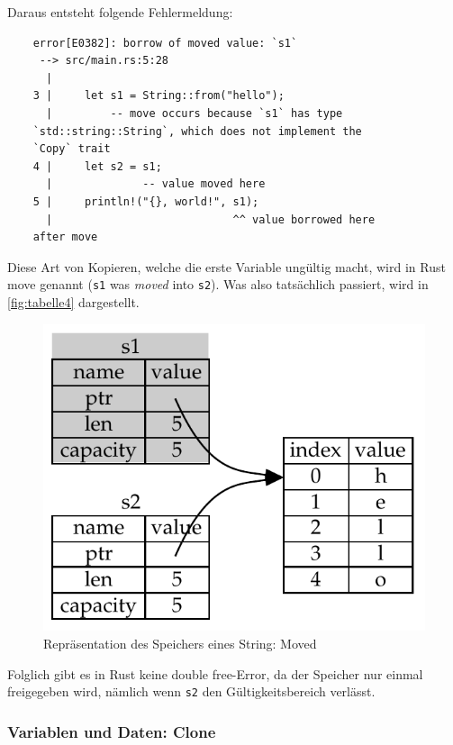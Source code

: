 Daraus entsteht folgende Fehlermeldung:


\begin{lstlisting}
    error[E0382]: borrow of moved value: `s1`
     --> src/main.rs:5:28
      |
    3 |     let s1 = String::from("hello");
      |         -- move occurs because `s1` has type
    `std::string::String`, which does not implement the
    `Copy` trait
    4 |     let s2 = s1;
      |              -- value moved here
    5 |     println!("{}, world!", s1);
      |                            ^^ value borrowed here
    after move
\end{lstlisting}

Diese Art von Kopieren, welche die erste Variable ungültig macht, wird in Rust \glqq move\grqq{} genannt (\verb"s1" was \textit{moved} into \verb"s2"). Was also tatsächlich passiert, wird in \autoref{fig:tabelle4} dargestellt.

\begin{figure}[htbp]
    \centering
    \includegraphics[scale=0.9]{Programmierung/Tabelle4.pdf}
    \caption{Repräsentation des Speichers eines String: Moved}
    \label{fig:tabelle4}
\end{figure}

Folglich gibt es in Rust keine \glqq double free\grqq{}-Error, da der Speicher nur einmal freigegeben wird, nämlich wenn \verb"s2" den Gültigkeitsbereich verlässt.

\subsubsection{Variablen und Daten: Clone}

